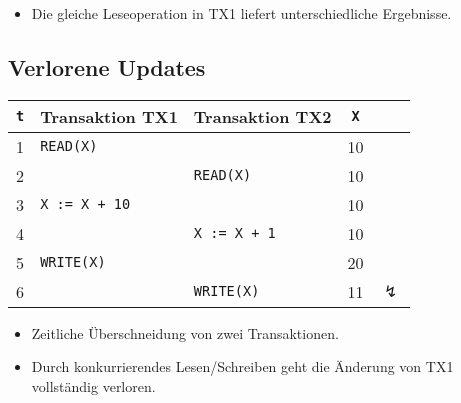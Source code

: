 \documentclass[a4paper, 11pt, accentcolor = tud3b]{tudreport}
\begin{document}
             \begin{itemize}
                	\item Die gleiche Leseoperation in TX1 liefert unterschiedliche Ergebnisse.
             \end{itemize}

            \subsection{Verlorene Updates} %
                \begin{table}[H]
                	\centering
                	\begin{tabular}{c | l | l | c c}
                		\textbf{\texttt{t}} & \textbf{Transaktion TX1} & \textbf{Transaktion TX2} & \textbf{\texttt{X}} &                \\ \hline
                		         1          & \texttt{READ(X)}         &                          & 10                  &                \\
                		         2          &                          & \texttt{READ(X)}         & 10                  &                \\
                		         3          & \texttt{X := X + 10}     &                          & 10                  &                \\
                		         4          &                          & \texttt{X := X + 1}      & 10                  &                \\
                		         5          & \texttt{WRITE(X)}        &                          & 20                  &                \\
                		         6          &                          & \texttt{WRITE(X)}        & 11                  & \(\lightning\)
                	\end{tabular}
                \end{table}
            
	            \begin{itemize}
	            	\item Zeitliche Überschneidung von zwei Transaktionen.
	            	\item Durch konkurrierendes Lesen/Schreiben geht die Änderung von TX1 vollständig verloren.
	            \end{itemize}
\end{document}

